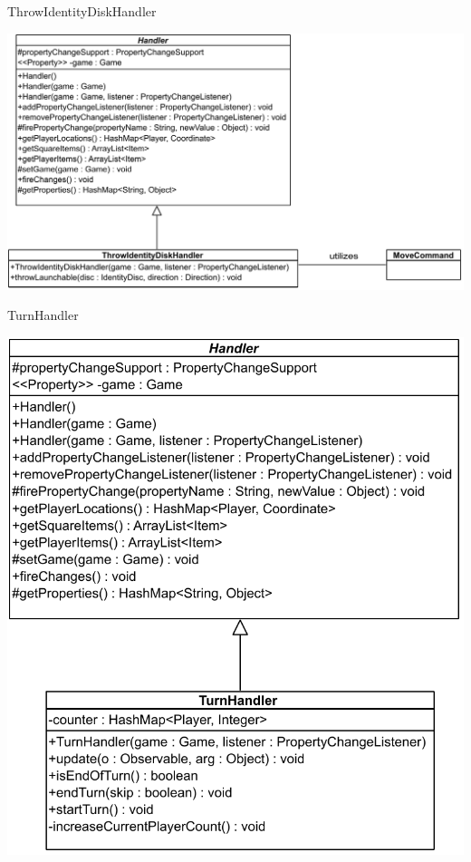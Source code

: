 \documentclass[11pt,t]{beamer}
\begin{document}
\begin{frame}{ThrowIdentityDiskHandler}
\begin{center}
\includegraphics[scale=0.45]{images/throwIdentityDischandler}
\end{center}
\end{frame}

\begin{frame}{TurnHandler}
\begin{center}
\includegraphics[scale=0.45]{images/turnhandler}
\end{center}
\end{frame}
\end{document}
